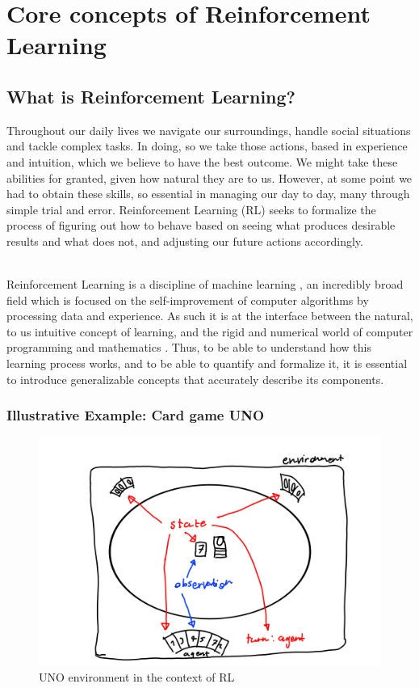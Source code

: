 \chapter{Core concepts of Reinforcement Learning}\label{chap:theory}
\section{What is Reinforcement Learning?}\label{sec:RL}
\noindent
Throughout our daily lives we navigate our surroundings, handle social situations and tackle complex tasks. In doing, so we take those actions, based in experience and intuition, which we believe to have the best outcome. We might take these abilities for granted, given how natural they are to us. However, at some point we had to obtain these skills, so essential in managing our day to day, many through simple trial and error. Reinforcement Learning (RL) seeks to formalize the process of figuring out how to behave based on seeing what produces desirable results and what does not, and adjusting our future actions accordingly. 

\noindent
\\ Reinforcement Learning is a discipline of machine learning \cite[p. 1]{sutton_reinforcement_2018}, an incredibly broad field which is focused on the self-improvement of computer algorithms by processing data and experience. As such it is at the interface between the natural, to us intuitive concept of learning, and the rigid and numerical world of computer programming and mathematics \cite[p. 4]{sutton_reinforcement_2018}. Thus, to be able to understand how this learning process works, and to be able to quantify and formalize it, it is essential to introduce generalizable concepts that accurately describe its components. 

\subsection{Illustrative Example: Card game UNO}\label{subsec:UNO}

\begin{figure}[ht]
    \centering
    \includegraphics[width=\linewidth]{figures/UNO.png}
    \caption{UNO environment in the context of RL}
    \label{fig:UNO}
\end{figure}

